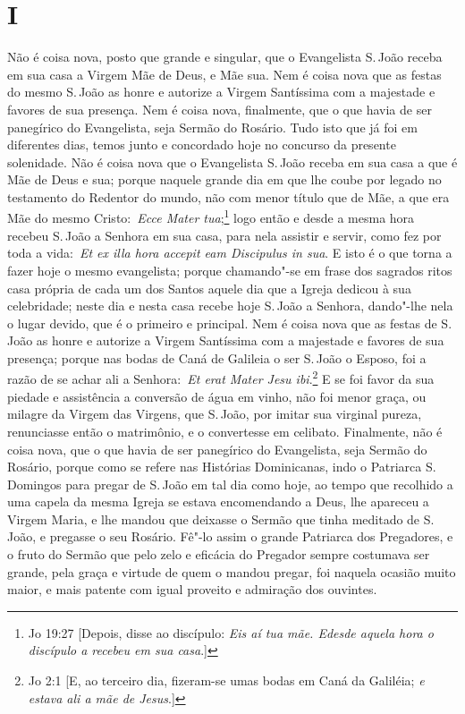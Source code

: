 \section*{I}

\noindent{}Não é coisa nova, posto que grande e singular, que o
Evangelista S.\,João receba em sua casa a Virgem Mãe de Deus, e Mãe sua.
Nem é coisa nova que as festas do mesmo S.\,João as honre e autorize a
Virgem Santíssima com a majestade e favores de sua presença. Nem é coisa
nova, finalmente, que o que havia de ser panegírico do Evangelista, seja
Sermão do Rosário. Tudo isto que já foi em diferentes dias, temos junto
e concordado hoje no concurso da presente solenidade. Não é coisa nova
que o Evangelista S.\,João receba em sua casa a que é Mãe de Deus e sua;
porque naquele grande dia em que lhe coube por legado no testamento do
Redentor do mundo, não com menor título que de Mãe, a que era Mãe do
mesmo Cristo:~\emph{Ecce Mater tua};\footnote{Jo 19:27 [Depois, disse ao discípulo: \textit{Eis aí tua mãe. Edesde aquela hora o discípulo a recebeu em sua casa}.]} logo então e desde
a mesma hora recebeu S.\,João a Senhora em sua casa, para nela assistir e
servir, como fez por toda a vida:~\emph{Et ex illa hora accepit eam
Discipulus in sua}. E isto é o que torna a fazer hoje o
mesmo evangelista; porque chamando"-se em frase dos sagrados ritos casa
própria de cada um dos Santos aquele dia que a Igreja dedicou à sua
celebridade; neste dia e nesta casa recebe hoje S.\,João a Senhora,
dando"-lhe nela o lugar devido, que é o primeiro e principal. Nem é coisa
nova que as festas de S.\,João as honre e autorize a Virgem Santíssima
com a majestade e favores de sua presença; porque nas bodas de Caná de
Galileia o ser S.\,João o Esposo, foi a razão de se achar ali a
Senhora:~\emph{Et erat Mater Jesu ibi}.\footnote{Jo 2:1 [E, ao terceiro dia, fizeram-se umas bodas em Caná da Galiléia; \textit{e estava ali a mãe de Jesus}.]} E se foi favor
da sua piedade e assistência a conversão de água em vinho, não foi menor
graça, ou milagre da Virgem das Virgens, que S.\,João, por imitar sua
virginal pureza, renunciasse então o matrimônio, e o convertesse em
celibato. Finalmente, não é coisa nova, que o que havia de ser
panegírico do Evangelista, seja Sermão do Rosário, porque como se refere
nas Histórias Dominicanas, indo o Patriarca S.\,Domingos para pregar de
S.\,João em tal dia como hoje, ao tempo que recolhido a uma capela da
mesma Igreja se estava encomendando a Deus, lhe apareceu a Virgem Maria,
e lhe mandou que deixasse o Sermão que tinha meditado de S.\,João, e
pregasse o seu Rosário. Fê"-lo assim o grande Patriarca dos Pregadores, e
o fruto do Sermão que pelo zelo e eficácia do Pregador sempre costumava
ser grande, pela graça e virtude de quem o mandou pregar, foi naquela
ocasião muito maior, e mais patente com igual proveito e admiração dos
ouvintes.


